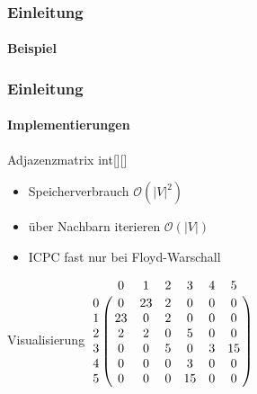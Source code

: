 \begin{frame}
    \frametitle{Einleitung}
    \framesubtitle{Beispiel}
\end{frame}

\begin{frame}
    \frametitle{Einleitung}
    \framesubtitle{Implementierungen}
    \begin{KITexampleblock}{Adjazenzmatrix}
    int[][]
    \begin{itemize}
        \item Speicherverbrauch \( \mathcal{O}(|V|^2)\)
        \item über Nachbarn iterieren \( \mathcal{O}(|V|)\)
        \item ICPC fast nur bei Floyd-Warschall
    \end{itemize}
    \end{KITexampleblock}
    \vspace{0.001em}
    \begin{KITinfoblock}{Visualisierung}
        $\bordermatrix{
  & 0  & 1  & 2  & 3  & 4  & 5  \cr
0 & 0  & 23 & 2  & 0  & 0  & 0  \cr
1 & 23 & 0  & 2  & 0  & 0  & 0  \cr
2 & 2  & 2  & 0  & 5  & 0  & 0  \cr
3 & 0  & 0  & 5  & 0  & 3  & 15 \cr
4 & 0  & 0  & 0  & 3  & 0  & 0  \cr
5 & 0  & 0  & 0  & 15 & 0  & 0  \cr
} $ %
    \end{KITinfoblock}
\end{frame}

